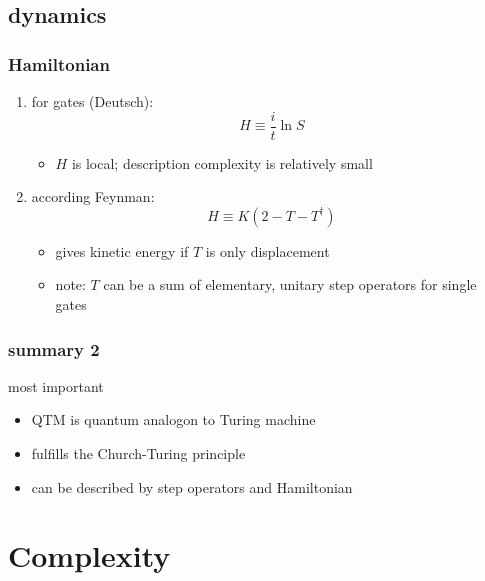 \documentclass{beamer}
\begin{document}
\subsection{dynamics}
\begin{frame}
	\frametitle{Hamiltonian}
	\begin{enumerate}
	\item<1-> for gates (Deutsch):
		\begin{equation}
        	H\equiv\frac{i}{t}\ln S
    	\end{equation}
    \begin{itemize}
		\item $H$ is local; description complexity is relatively small
	\end{itemize}
	\item<2-> according Feynman:
    	\begin{equation}
        	H\equiv K(2-T-T^\dagger)
    	\end{equation}
	\begin{itemize}
		\item gives kinetic energy if $T$ is only displacement
		\item note: $T$ can be a sum of elementary, unitary step operators for single gates
    \end{itemize}
	\end{enumerate}
\end{frame}
%
\begin{frame}
	\frametitle{summary 2}
	\begin{block}{most important}
		\begin{itemize}
			\item QTM is quantum analogon to Turing machine
			\item fulfills the Church-Turing principle
			\item can be described by step operators and Hamiltonian
		\end{itemize}
	\end{block}
\end{frame}
\begin{frame}
 \tableofcontents
\end{frame}
%
%
\section{Complexity}
%
\end{document}
